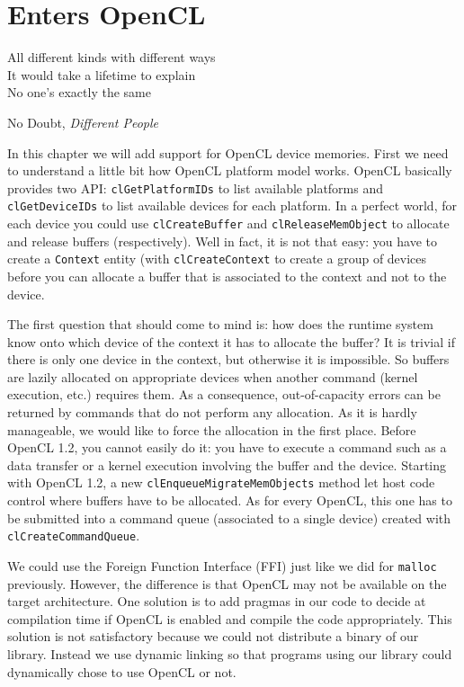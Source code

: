\chapter{Enters OpenCL}

\epigraph{
All different kinds with different ways\\
It would take a lifetime to explain\\
No one's exactly the same}
{No Doubt, \textit{Different People}}

In this chapter we will add support for OpenCL device memories. First we need to
understand a little bit how OpenCL platform model works. OpenCL basically
provides two API: \texttt{clGetPlatformIDs} to list available platforms and
\texttt{clGetDeviceIDs} to list available devices for each platform. In a
perfect world, for each device you could use \texttt{clCreateBuffer} and
\texttt{clReleaseMemObject} to allocate and release buffers (respectively). Well
in fact, it is not that easy: you have to create a \texttt{Context} entity (with
\texttt{clCreateContext} to create a group of devices before you can allocate a
buffer that is associated to the context and not to the device.

The first question that should come to mind is: how does the runtime system know
onto which device of the context it has to allocate the buffer? It is trivial if
there is only one device in the context, but otherwise it is impossible. So
buffers are lazily allocated on appropriate devices when another command (kernel
execution, etc.) requires them. As a consequence, out-of-capacity errors can be
returned by commands that do not perform any allocation. As it is hardly
manageable, we would like to force the allocation in the first place. Before
OpenCL 1.2, you cannot easily do it: you have to execute a command such as a
data transfer or a kernel execution involving the buffer and the device.
Starting with OpenCL 1.2, a new \texttt{clEnqueueMigrateMemObjects} method let
host code control where buffers have to be allocated. As for every OpenCL, this
one has to be submitted into a command queue (associated to a single device)
created with \texttt{clCreateCommandQueue}.

We could use the Foreign Function Interface (FFI) just like we did for
\texttt{malloc} previously. However, the difference is that OpenCL may not be
available on the target architecture. One solution is to add pragmas in our code
to decide at compilation time if OpenCL is enabled and compile the code
appropriately. This solution is not satisfactory because we could not distribute
a binary of our library. Instead we use dynamic linking so that programs using
our library could dynamically chose to use OpenCL or not.

